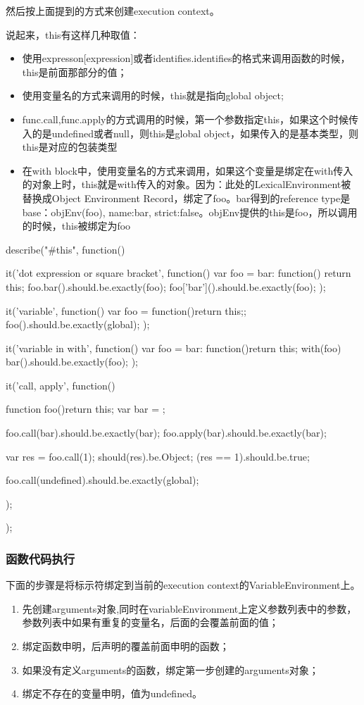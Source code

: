 然后按上面提到的方式来创建execution context。

说起来，this有这样几种取值：
\begin{itemize}
\item 使用expresson[expression]或者identifies.identifies的格式来调用函数的时候，this是前面那部分的值；
\item 使用变量名的方式来调用的时候，this就是指向global object;
\item func.call,func.apply的方式调用的时候，第一个参数指定this，如果这个时候传入的是undefined或者null，则this是global object，如果传入的是基本类型，则this是对应的包装类型
\item 在with block中，使用变量名的方式来调用，如果这个变量是绑定在with传入的对象上时，this就是with传入的对象。因为：此处的LexicalEnvironment被替换成Object Environment Record，绑定了foo。bar得到的reference type是{base：objEnv(foo), name:bar, strict:false}。objEnv提供的this是foo，所以调用的时候，this被绑定为foo
\end{itemize}

\begin{JavaScript}
	describe("#this", function(){
		it('dot expression or square bracket', function(){
			var foo = {
				bar: function(){ return this;}
			}
			foo.bar().should.be.exactly(foo);
			foo['bar']().should.be.exactly(foo);
		});

		it('variable', function(){
			var foo = function(){return this;};
			foo().should.be.exactly(global);
		});

		it('variable in with', function(){
			var foo = {
				bar: function(){return this;}
			}
			with(foo){
				bar().should.be.exactly(foo);
			}
		});

		it('call, apply', function(){
			function foo(){return this;}
			var bar = {};
			
			foo.call(bar).should.be.exactly(bar);
			foo.apply(bar).should.be.exactly(bar);

			var res = foo.call(1);
			should(res).be.Object;
			(res == 1).should.be.true;

			foo.call(undefined).should.be.exactly(global);
		});
	});
\end{JavaScript}


\subsubsection{函数代码执行}
下面的步骤是将标示符绑定到当前的execution context的VariableEnvironment上。
\begin{enumerate}
\item 先创建arguments对象,同时在variableEnvironment上定义参数列表中的参数，参数列表中如果有重复的变量名，后面的会覆盖前面的值；
\item 绑定函数申明，后声明的覆盖前面申明的函数；
\item 如果没有定义arguments的函数，绑定第一步创建的arguments对象；
\item 绑定不存在的变量申明，值为undefined。
\end{enumerate}

